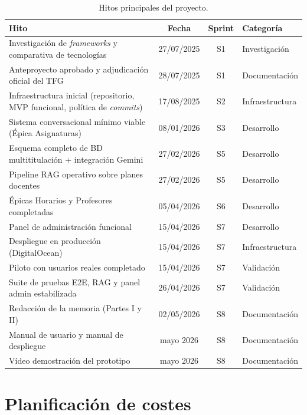 \begin{table}[hbtp]
\centering
\small
\begin{tabular}{|p{5.5cm}|c|c|p{2.8cm}|}
\hline
\textbf{Hito} & \textbf{Fecha} & \textbf{Sprint} & \textbf{Categoría} \\ \hline
Investigación de \textit{frameworks} y comparativa de tecnologías & 27/07/2025 & S1 & Investigación \\ \hline
Anteproyecto aprobado y adjudicación oficial del TFG & 28/07/2025 & S1 & Documentación \\ \hline
Infraestructura inicial (repositorio, MVP funcional, política de \textit{commits}) & 17/08/2025 & S2 & Infraestructura \\ \hline
Sistema conversacional mínimo viable (Épica Asignaturas) & 08/01/2026 & S3 & Desarrollo \\ \hline
Esquema completo de BD multititulación + integración Gemini & 27/02/2026 & S5 & Desarrollo \\ \hline
Pipeline RAG operativo sobre planes docentes & 27/02/2026 & S5 & Desarrollo \\ \hline
Épicas Horarios y Profesores completadas & 05/04/2026 & S6 & Desarrollo \\ \hline
Panel de administración funcional & 15/04/2026 & S7 & Desarrollo \\ \hline
Despliegue en producción (DigitalOcean) & 15/04/2026 & S7 & Infraestructura \\ \hline
Piloto con usuarios reales completado & 15/04/2026 & S7 & Validación \\ \hline
Suite de pruebas E2E, RAG y panel admin estabilizada & 26/04/2026 & S7 & Validación \\ \hline
Redacción de la memoria (Partes I y II) & 02/05/2026 & S8 & Documentación \\ \hline
Manual de usuario y manual de despliegue & mayo 2026 & S8 & Documentación \\ \hline
Vídeo demostración del prototipo & mayo 2026 & S8 & Documentación \\ \hline
\end{tabular}
\caption{Hitos principales del proyecto.}
\label{tab:hitos}
\end{table}


\section{Planificación de costes}\label{sec:costes}

